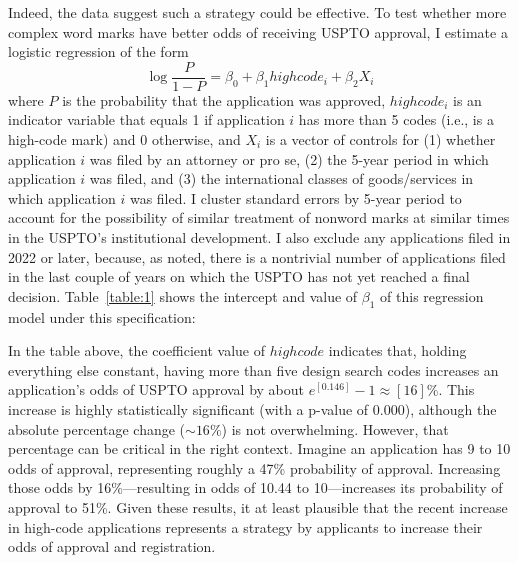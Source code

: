 \documentclass[letterpaper, 11pt, oneside]{article}
\begin{document}
Indeed, the data suggest such a strategy could be effective. To test whether more complex word marks have better odds of receiving USPTO approval, I estimate a logistic regression of the form \
\begin{equation}
\log{\frac{P}{1-P}}=\beta_0+\beta_1highcode_i+\beta_2X_i
\end{equation}
where $P$ is the probability that the application was approved, $highcode_i$ is an indicator variable that equals 1 if application $i$ has more than 5 codes (i.e., is a high-code mark) and 0 otherwise, and $X_i$ is a vector of controls for (1) whether application $i$ was filed by an attorney or pro se, (2) the 5-year period in which application $i$ was filed, and (3) the international classes of goods/services in which application $i$ was filed. I cluster standard errors by 5-year period to account for the possibility of similar treatment of nonword marks at similar times in the USPTO's institutional development. I also exclude any applications filed in 2022 or later, because, as noted, there is a nontrivial number of applications filed in the last couple of years on which the USPTO has not yet reached a final decision. Table~\ref{table:1} shows the intercept and value of $\beta_1$ of this regression model under this specification:

 \par

\noindent In the table above, the coefficient value of $highcode$ indicates that, holding everything else constant, having more than five design search codes increases an application's odds of USPTO approval by about $e^[0.146]-1 \approx [16]\%$. This increase is highly statistically significant (with a p-value of 0.000), although the absolute percentage change ($\sim16\%$) is not overwhelming. However, that percentage can be critical in the right context. Imagine an application has 9 to 10 odds of approval, representing roughly a 47\% probability of approval. Increasing those odds by 16\%—resulting in odds of 10.44 to 10—increases its probability of approval to 51\%. Given these results, it at least plausible that the recent increase in high-code applications represents a strategy by applicants to increase their odds of approval and registration. 
\end{document}
